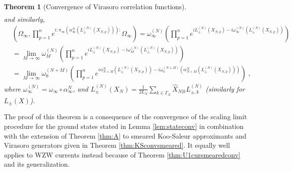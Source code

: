 \documentclass[a4paper, 11pt]{article}
\DeclareMathOperator{\1}{\mathds{1}}
\newtheorem{letterthm}{Theorem}
\begin{document}
\begin{letterthm}[Convergence of Virasoro correlation functions]
\begin{align*}
\end{align*}
and similarly,
\begin{align*}
& (\Omega_{\infty},\prod_{p=1}^{n}e^{i:\pi_{\infty}(\alpha^{N}_{\infty}(L^{(N)}_{\pm}(X_{N,p})\!)\!):}\Omega_{\infty}) = \omega^{(N)}_{\infty}(\prod_{p=1}^{n}e^{iL^{(N)}_{\pm}(X_{N,p})-i\omega^{(N)}_{\infty}(L^{(N)}_{\pm}(X_{N,p})\!)}) \\
& = \lim_{M\rightarrow\infty}\omega^{(N)}_{M}(\prod_{p=1}^{n}e^{iL^{(N)}_{\pm}(X_{N,p})-i\omega^{(N)}_{M}(L^{(N)}_{\pm}(X_{N,p})\!)}) \\
& = \lim_{M\rightarrow\infty}\omega^{(N+M)}_{0}\!(\prod_{p=1}^{n}e^{i\alpha^{N}_{N+M}(L^{(N)}_{\pm}(X_{N,p})\!)-i\omega^{(N+M)}_{0}\!(\alpha^{N}_{N+M}(L^{(N)}_{\pm}(X_{N,p})\!)\!)}) \;,
\end{align*}
where $\omega^{(N)}_{\infty} = \omega_{\infty}\circ\alpha^{N}_{\infty}$, and $L^{(N)}_{\pm}(X_{N})\!=\!\tfrac{1}{2L_{N}}\!\sum_{k\in\Gamma_{N}}\!\hat{X}_{N|k}L^{(N)}_{\pm,k}$ (similarly for $L_{\pm}(X)$).
\end{letterthm}
The proof of this theorem is a consequence of the convergence of the scaling limit procedure for the ground states stated in Lemma \ref{lem:stateconv} in combination with the extension of Theorem \ref{thm:A} to smeared Koo-Saleur approximants and Virasoro generators given in Theorem \ref{thm:KSconvsmeared}. It equally well applies to WZW currents instead because of Theorem \ref{thm:U1cursmearedconv} and its generalization. 

\bigskip
\end{document}
